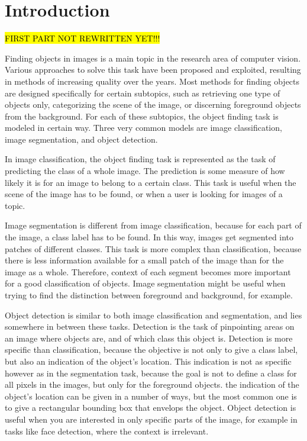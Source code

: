 \section{Introduction} %
\label{cha:introduction}
\hl{FIRST PART NOT REWRITTEN YET!!!}


Finding objects in images is a main topic in the research area of computer vision. Various approaches to solve this task have been proposed and exploited, resulting in methods of increasing quality over the years. Most methods for finding objects are designed specifically for certain subtopics, such as retrieving one type of objects only, categorizing the scene of the image, or discerning foreground objects from the background. For each of these subtopics, the object finding task is modeled in certain way. Three very common models are image classification, image segmentation, and object detection.

In image classification, the object finding task is represented as the task of predicting the class of a whole image. The prediction is some measure of how likely it is for an image to belong to a certain class. This task is useful when the scene of the image has to be found, or when a user is looking for images of a topic.

Image segmentation is different from image classification, because for each part of the image, a class label has to be found. In this way, images get segmented into patches of different classes. This task is more complex than classification, because there is less information available for a small patch of the image than for the image as a whole. Therefore, context of each segment becomes more important for a good classification of objects. Image segmentation might be useful when trying to find the distinction between foreground and background, for example.

Object detection is similar to both image classification and segmentation, and lies somewhere in between these tasks. Detection is the task of pinpointing areas on an image where objects are, and of which class this object is. Detection is more specific than classification, because the objective is not only to give a class label, but also an indication of the object's location. This indication is not as specific however as in the segmentation task, because the goal is not to define a class for all pixels in the images, but only for the foreground objects. the indication of the object's location can be given in a number of ways, but the most common one is to give a rectangular bounding box that envelops the object. \cite{pascal-voc-2007} Object detection is useful when you are interested in only specific parts of the image, for example in tasks like face detection, where the context is irrelevant. 

